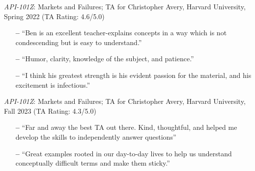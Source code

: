 \documentclass[margin,line,pifont,palatino,courier, 9pt]{res}
\begin{document}
\begin{resume}
\textit{API-101Z}: Markets and Failures; TA for Christopher Avery, Harvard University, Spring 2022 (TA Rating: 4.6/5.0)
\vspace{2mm}
\begin{itemize}\setlength{\itemsep}{0pt}
    \small
    \item[\textbf{--}] ``Ben is an excellent teacher-explains concepts in a way which is not condescending but is easy to understand.''
    \item[\textbf{--}] ``Humor, clarity, knowledge of the subject, and patience.''
    \item[\textbf{--}] ``I think his greatest strength is his evident passion for the material, and his excitement is infectious.''
\end{itemize}

\textit{API-101Z}: Markets and Failures; TA for Christopher Avery, Harvard University, Fall 2023 (TA Rating: 4.3/5.0)
\vspace{2mm}
\begin{itemize}\setlength{\itemsep}{0pt}
    \small
    \item[\textbf{--}] ``Far and away the best TA out there. Kind, thoughtful, and helped me develop the skills to independently answer questions''
    \item[\textbf{--}] ``Great examples rooted in our day-to-day lives to help us understand conceptually difficult terms and make them sticky.''
\end{itemize}





\end{resume}
\end{document}

